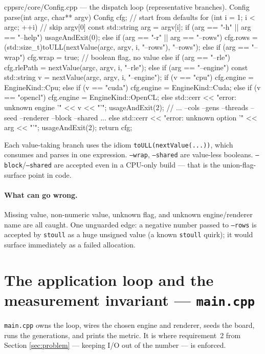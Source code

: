 \documentclass[
	english,
	letterpaper, oneside
]{article}
\begin{document}
\begin{sourcecode}{cpp}{src/core/Config.cpp --- the dispatch loop (representative branches).}
Config parse(int argc, char** argv) {
  Config cfg;                                   // start from defaults
  for (int i = 1; i < argc; ++i) {              // skip argv[0]
    const std::string arg = argv[i];
    if (arg == "-h" || arg == "--help") usageAndExit(0);
    else if (arg == "-r" || arg == "--rows")
      cfg.rows = (std::size_t)toULL(nextValue(argc, argv, i, "--rows"), "--rows");
    else if (arg == "--wrap")  cfg.wrap = true;            // boolean flag, no value
    else if (arg == "--rle")   cfg.rlePath = nextValue(argc, argv, i, "--rle");
    else if (arg == "--engine") {
      const std::string v = nextValue(argc, argv, i, "--engine");
      if (v == "cpu") cfg.engine = EngineKind::Cpu;
      else if (v == "cuda") cfg.engine = EngineKind::Cuda;
      else if (v == "opencl") cfg.engine = EngineKind::OpenCL;
      else { std::cerr << "error: unknown engine '" << v << "'\n"; usageAndExit(2); }
    }
    // ... --cols --gens --threads --seed --renderer --block --shared ...
    else { std::cerr << "error: unknown option '" << arg << "'\n"; usageAndExit(2); }
  }
  return cfg;
}
\end{sourcecode}

Each value-taking branch uses the idiom \texttt{toULL(nextValue(...))}, which
consumes and parses in one expression. \texttt{--wrap}, \texttt{--shared} are
value-less booleans. \texttt{--block}/\texttt{--shared} are accepted even in a
CPU-only build --- that is the union-flag-surface point in code.

\paragraph{What can go wrong.} Missing value, non-numeric value, unknown flag,
and unknown engine/renderer name are all caught. One unguarded edge: a negative
number passed to \texttt{--rows} is accepted by \texttt{stoull} as a huge
unsigned value (a known \texttt{stoull} quirk); it would surface immediately as a
failed allocation.

\section{The application loop and the measurement invariant --- \texttt{main.cpp}}
\label{sec:main}

\texttt{main.cpp} owns the loop, wires the chosen engine and renderer, seeds the
board, runs the generations, and prints the metric. It is where requirement~2
from Section \ref{sec:problem} --- keeping I/O out of the number --- is enforced.
\end{document}
